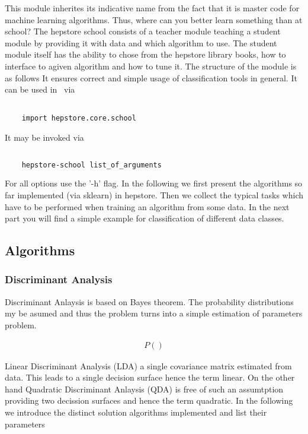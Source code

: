 This module inherites its indicative name from the fact that it is
master code for machine learning algorithms. Thus, where can you
better learn something than at school? The hepstore school consists of
a teacher module teaching a student module by providing it with data
and which algorithm to use. The student module itself has the ability
to chose from the hepstore library books, how to interface to agiven
algorithm and how to tune it. The structure of the module is as
follows
%
\hspace*{0.5cm}
\hspace*{0.5cm}
%
It ensures correct and simple usage of classification tools in
general. It can be used in \python~via
%
\begin{changemargin}{1.5cm}{1.5cm}
  \centering
  \begin{lstlisting}
    
    import hepstore.core.school
  \end{lstlisting}
\end{changemargin}
%
It may be invoked via
%
\begin{changemargin}{1.5cm}{1.5cm}
  \centering
  \begin{lstlisting}[language=Bash]
    
    hepstore-school list_of_arguments
  \end{lstlisting}
\end{changemargin}
%
For all options use the '-h' flag. In the following we first present
the algorithms so far implemented (via sklearn) in hepstore. Then we
collect the typical tasks which have to be performed when training an
algorithm from some data. In the next part you will find a simple
example for classification of different data classes.

\subsection{Algorithms}

\subsubsection{Discriminant Analysis}
Discriminant Anlaysis is based on Bayes theorem. The probability
distributions my be asumed and thus the problem turns into a simple
estimation of parameters problem.
%
\begin{ceqn}
  \begin{align}
    P()
    \label{eq:}
  \end{align}
\end{ceqn}
%
Linear Discriminant Analysis (LDA) a single covariance matrix
estimated from data. This leads to a single decision surface hence the
term linear. On the other hand Quadratic Discriminant Anlaysis (QDA)
is free of such an assumtption providing two decission surfaces and
hence the term quadratic. In the following we introduce the distinct
solution algorithms implemented and list their parameters

